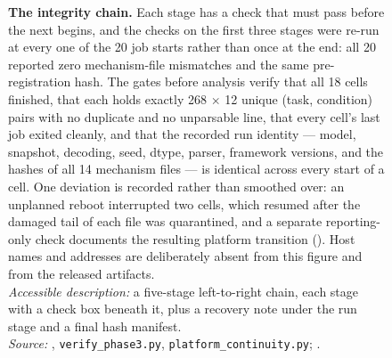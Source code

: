 \begin{figure}[t]

\vspace{1mm}
\caption[Experimental integrity chain]{%
\textbf{The integrity chain.} Each stage has a check that must pass before the next begins, and the checks on the
first three stages were re-run at every one of the 20 job starts rather than once at the end: all 20 reported zero
mechanism-file mismatches and the same pre-registration hash. The gates before analysis verify that all 18 cells
finished, that each holds exactly 268 $\times$ 12 unique (task, condition) pairs with no duplicate and no
unparsable line, that every cell's last job exited cleanly, and that the recorded run identity --- model, snapshot,
decoding, seed, dtype, parser, framework versions, and the hashes of all 14 mechanism files --- is identical across
every start of a cell. One deviation is recorded rather than smoothed over: an unplanned reboot interrupted two
cells, which resumed after the damaged tail of each file was quarantined, and a separate reporting-only check
documents the resulting platform transition (). Host names and addresses are deliberately
absent from this figure and from the released artifacts.\\
\emph{Accessible description:} a five-stage left-to-right chain, each stage with a check box beneath it, plus a
recovery note under the run stage and a final hash manifest.\\
\emph{Source:} , \texttt{verify\_phase3.py},
\texttt{platform\_continuity.py}; .}
\label{fig:integrity}
\end{figure}

